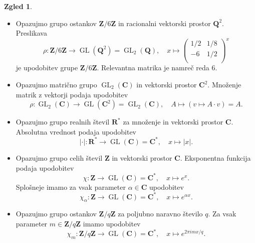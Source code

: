\documentclass[11pt]{book}
\def\ZZ{\mathbf{Z}}
\def\QQ{\mathbf{Q}}
\def\RR{\mathbf{R}}
\def\CC{\mathbf{C}}
\DeclareMathOperator\GL{GL}
\theoremstyle{definition}
\theoremstyle{zgled}
\newtheorem*{zgled}{Zgled}
\theoremstyle{odprtproblem}
\theoremstyle{domacanaloga}
\theoremstyle{izrek}
\begin{document}
\begin{zgled} \leavevmode
    \begin{itemize}
        \item Opazujmo grupo ostankov $\ZZ/6\ZZ$ in racionalni vektorski prostor $\QQ^2$. Preslikava
        \[
            \rho \colon \ZZ/6\ZZ \to \GL(\QQ^2) = {\textstyle \GL_2(\QQ)}, \quad
            x \mapsto  \begin{pmatrix}
                1/2 & 1/8 \\
                -6 & 1/2 \\
            \end{pmatrix}^x
        \]
        je upodobitev grupe $\ZZ/6\ZZ$. Relevantna matrika je namreč reda $6$.

        \item Opazujmo matrično grupo $\GL_2(\CC)$ in vektorski prostor $\CC^2$. Množenje matrik z vektorji podaja upodobitev
        \[
            \rho \colon \GL_2(\CC) \to \GL(\CC^2) = \GL_2(\CC), \quad
            A \mapsto \left( v \mapsto A \cdot v \right) = A.
        \]

        \item Opazujmo grupo realnih števil $\RR^*$ za množenje in vektorski prostor $\CC$. Absolutna vrednost podaja upodobitev
        \[
            |\cdot| \colon \RR^* \to \GL(\CC) = \CC^*, \quad
            x \mapsto |x|.
        \]
        \item Opazujmo grupo celih števil $\ZZ$ in vektorski prostor $\CC$. Eksponentna funkcija podaja upodobitev
        \[
            \chi \colon \ZZ \to \GL(\CC) = \CC^*, \quad
            x \mapsto e^x.
        \]
        Splošneje imamo za vsak parameter $\alpha \in \CC$ upodobitev
        \[
            \chi_{\alpha} \colon \ZZ \to \GL(\CC) = \CC^*, \quad
            x \mapsto e^{\alpha x}.
        \] 
        \item Opazujmo grupo ostankov $\ZZ/q\ZZ$ za poljubno naravno število $q$. Za vsak parameter $m \in \ZZ/q\ZZ$ imamo upodobitev
        \[
            \chi_m \colon \ZZ/q\ZZ \to \GL(\CC) = \CC^*, \quad
            x \mapsto e^{2 \pi i mx/q}.
        \]


\end{itemize}
\end{zgled}
\end{document}

